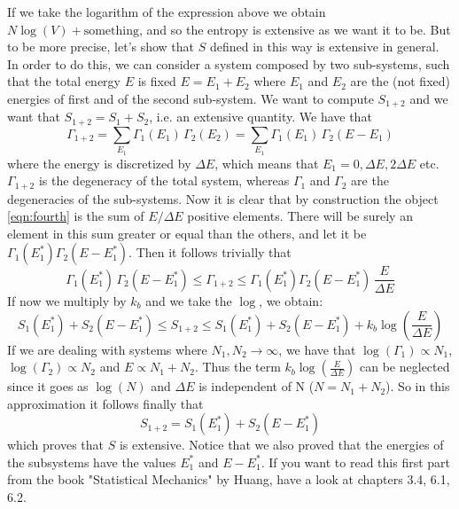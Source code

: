 If we take the logarithm of the expression above we obtain $N\log(V)+\text{something}$, and so the entropy is extensive as we want it to be. 
But to be more precise, let's show that $S$ defined in this way is extensive in general. In order to do this, we can consider a system composed by two sub-systems, such that the total energy $E$ is fixed $E = E_1+E_2$ where $E_1$ and $E_2$ are the (not fixed) energies of first and of the second sub-system. We want to compute $S_{1+2}$ and we want that $S_{1+2} = S_1+S_2$, i.e. an extensive quantity. We have that
\begin{equation}
\label{eqn:fourth}
\Gamma_{1+2}=\sum_{E_1}\Gamma_1(E_1)\,\Gamma_2(E_2) = \sum_{E_1}\Gamma_1(E_1)\,\Gamma_2(E-E_1)
\end{equation}
where the energy is discretized by $\Delta E$, which means that $E_1 = 0, \Delta E, 2\Delta E $ etc. $\Gamma_{1+2}$ is the degeneracy of the total system, whereas $\Gamma_1$ and $\Gamma_2$ are the degeneracies of the sub-systems. Now it is clear that by construction the object \ref{eqn:fourth} is the sum of $E/\Delta E$ positive elements. There will be surely an element in this sum greater or equal than the others, and let it be $\Gamma_1(E_1^\ast)\Gamma_2(E-E_1^\ast)$. Then it follows trivially that
\begin{equation}
\Gamma_1(E_1^\ast)\,\Gamma_2(E-E_1^\ast)\le\Gamma_{1+2}\le \Gamma_1(E_1^\ast)\Gamma_2(E-E_1^\ast)\,\frac{E}{\Delta E}
\end{equation}
If now we multiply by $k_b$ and we take the $\log$, we obtain:
\begin{equation}
S_1(E_1^\ast)+S_2(E-E_1^\ast)\le S_{1+2}\le S_1(E_1^\ast)+S_2(E-E_1^\ast)+k_b\log(\frac{E}{\Delta E})
\end{equation}
If we are dealing with systems where $N_1, N_2\to\infty$, we have that $\log(\Gamma_1)\propto N_1$, $\log(\Gamma_2)\propto N_2$ and $E\propto N_1+N_2$. Thus the term $k_b\log(\frac{E}{\Delta E})$ can be neglected since it goes as $\log(N)$ and $\Delta E$ is independent of N ($N = N_1+N_2$). So in this approximation it follows finally that
\begin{equation}
S_{1+2} = S_1(E_1^\ast)+S_2(E-E_1^\ast)
\end{equation}
which proves that $S$ is extensive. Notice that we also proved that the energies of the subsystems have the values $E_1^\ast$ and $E-E_1^\ast$. If you want to read this first part from the book "Statistical Mechanics" by Huang, have a look at chapters 3.4, 6.1, 6.2.

